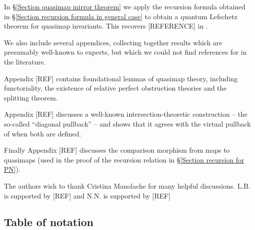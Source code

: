 In \S \ref{Section quasimap mirror theorem} we apply the recursion formula obtained in \S \ref{Section recursion formula in general case} to obtain a quantum Lefschetz theorem for quasimap invariants. This recovers [REFERENCE] in \cite{CF-K-wallcrossing}.

We also include several appendices, collecting together results which are presumably well-known to experts, but which we could not find references for in the literature.

Appendix [REF] contains foundational lemmas of quasimap theory, including functoriality, the existence of relative perfect obstruction theories and the splitting theorem.

Appendix [REF] discusses a well-known intersection-theoretic construction -- the so-called ``diagonal pullback'' -- and shows that it agrees with the virtual pullback of \cite{Manolache-Pull} when both are defined.

Finally Appendix [REF] discusses the comparison morphism from maps to quasimaps (used in the proof of the recursion relation in \S \ref{Section recursion for PN}).

\begin{acknowledgements} The authors wish to thank Cristina Manolache for many helpful discussions. L.B. is supported by [REF] and N.N. is supported by [REF]
\end{acknowledgements}

\subsection{Table of notation}












